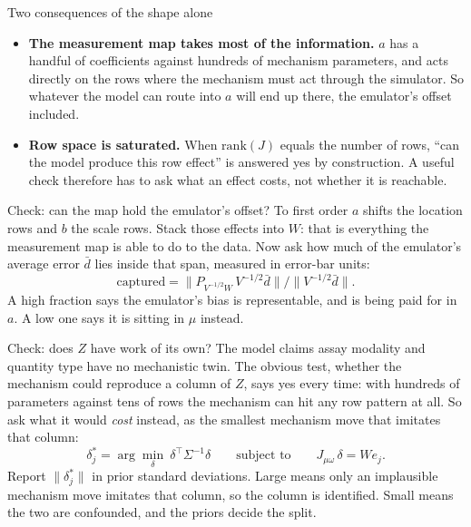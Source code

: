 \documentclass[10pt,aspectratio=169]{beamer}
\newcommand{\Tr}{^{\!\top}}
\begin{document}
\begin{frame}[t]{Two consequences of the shape alone}
  \begin{itemize}\setlength\itemsep{12pt}
    \item \textbf{The measurement map takes most of the information.} $a$ has a
      handful of coefficients against hundreds of mechanism parameters, and acts
      directly on the rows where the mechanism must act through the simulator.
      So whatever the model can route into $a$ will end up there, the emulator's
      offset included.
    \item \textbf{Row space is saturated.} When $\mathrm{rank}(J)$ equals the
      number of rows, ``can the model produce this row effect'' is answered yes
      by construction. A useful check therefore has to ask what an effect costs,
      not whether it is reachable.
  \end{itemize}
\end{frame}

\begin{frame}[t]{Check: can the map hold the emulator's offset?}
  To first order $a$ shifts the location rows and $b$ the scale rows. Stack those
  effects into $W$: that is everything the measurement map is able to do to the
  data. Now ask how much of the emulator's average error $\bar d$ lies inside
  that span, measured in error-bar units:
  \[
    \text{captured} = \big\|P_{V^{-1/2}W}\,V^{-1/2}\bar d\big\|
      \Big/ \big\|V^{-1/2}\bar d\big\| .
  \]
  \vfill
  A high fraction says the emulator's bias is representable, and is being paid
  for in $a$. A low one says it is sitting in $\mu$ instead.
\end{frame}

\begin{frame}[t]{Check: does $Z$ have work of its own?}
  The model claims assay modality and quantity type have no mechanistic twin.
  The obvious test, whether the mechanism could reproduce a column of $Z$, says
  yes every time: with hundreds of parameters against tens of rows the mechanism
  can hit any row pattern at all. So ask what it would \emph{cost} instead, as
  the smallest mechanism move that imitates that column:
  \[
    \delta^\ast_j = \arg\min_\delta\ \delta\Tr\Sigma^{-1}\delta
    \qquad\text{subject to}\qquad J_{\mu\omega}\,\delta = We_j .
  \]
  \vfill
  Report $\|\delta^\ast_j\|$ in prior standard deviations. Large means only an
  implausible mechanism move imitates that column, so the column is identified.
  Small means the two are confounded, and the priors decide the split.
\end{frame}
\end{document}
